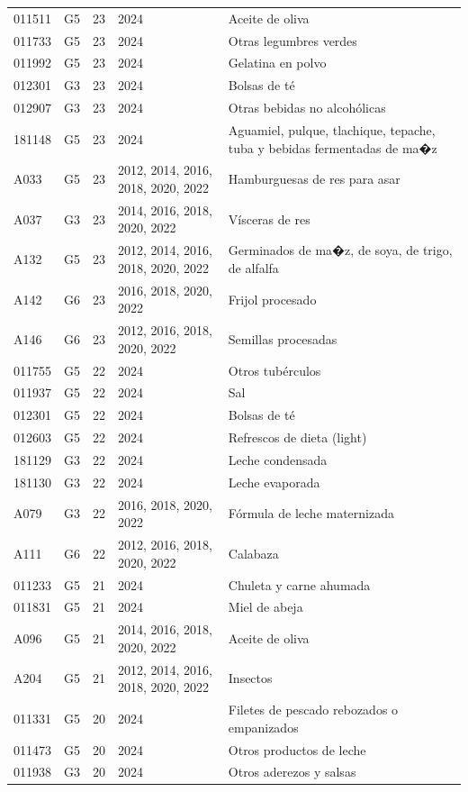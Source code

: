 \begin{table}[ht]
\begin{tabular}{llrll}
  011511 & G5 &  23 & 2024 & Aceite de oliva \\ 
  011733 & G5 &  23 & 2024 & Otras legumbres verdes \\ 
  011992 & G5 &  23 & 2024 & Gelatina en polvo \\ 
  012301 & G3 &  23 & 2024 & Bolsas de té \\ 
  012907 & G3 &  23 & 2024 & Otras bebidas no alcohólicas \\ 
  181148 & G5 &  23 & 2024 & Aguamiel, pulque, tlachique, tepache, tuba y bebidas fermentadas de ma�z \\ 
  A033 & G5 &  23 & 2012, 2014, 2016, 2018, 2020, 2022 & Hamburguesas de res para asar \\ 
  A037 & G3 &  23 & 2014, 2016, 2018, 2020, 2022 & Vísceras de res \\ 
  A132 & G5 &  23 & 2012, 2014, 2016, 2018, 2020, 2022 & Germinados de ma�z, de soya, de trigo, de alfalfa \\ 
  A142 & G6 &  23 & 2016, 2018, 2020, 2022 & Frijol procesado \\ 
  A146 & G6 &  23 & 2012, 2016, 2018, 2020, 2022 & Semillas procesadas \\ 
  011755 & G5 &  22 & 2024 & Otros tubérculos \\ 
  011937 & G5 &  22 & 2024 & Sal \\ 
  012301 & G5 &  22 & 2024 & Bolsas de té \\ 
  012603 & G5 &  22 & 2024 & Refrescos de dieta (light) \\ 
  181129 & G3 &  22 & 2024 & Leche condensada \\ 
  181130 & G3 &  22 & 2024 & Leche evaporada \\ 
  A079 & G3 &  22 & 2016, 2018, 2020, 2022 & Fórmula de leche maternizada \\ 
  A111 & G6 &  22 & 2012, 2016, 2018, 2020, 2022 & Calabaza \\ 
  011233 & G5 &  21 & 2024 & Chuleta y carne ahumada \\ 
  011831 & G5 &  21 & 2024 & Miel de abeja \\ 
  A096 & G5 &  21 & 2014, 2016, 2018, 2020, 2022 & Aceite de oliva \\ 
  A204 & G5 &  21 & 2012, 2014, 2016, 2018, 2020, 2022 & Insectos \\ 
  011331 & G5 &  20 & 2024 & Filetes de pescado rebozados o empanizados \\ 
  011473 & G5 &  20 & 2024 & Otros productos de leche \\ 
  011938 & G3 &  20 & 2024 & Otros aderezos y salsas \\ 

\end{tabular}
\end{table}
